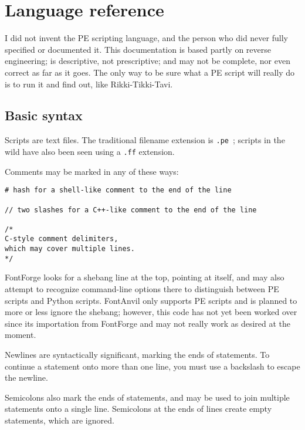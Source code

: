 \chapter{Language reference}

\begin{framed}
I did not invent the PE scripting language, and the person who did never
fully specified or documented it.  This documentation is based partly on
reverse engineering; is descriptive, not prescriptive; and may not be
complete, nor even correct as far as it goes.  The only way to be sure
what a PE script will really do is to run it and find out, like
Rikki-Tikki-Tavi.
\end{framed}

\section{Basic syntax}

Scripts are text files.  The traditional filename extension is \texttt{.pe}~;
scripts in the wild have also been seen using a \texttt{.ff} extension.

Comments may be marked in any of these ways:
\begin{verbatim}
# hash for a shell-like comment to the end of the line

// two slashes for a C++-like comment to the end of the line

/*
C-style comment delimiters,
which may cover multiple lines.
*/
\end{verbatim}

FontForge looks for a shebang line at the top, pointing at itself, and may
also attempt to recognize command-line options there to distinguish between
PE scripts and Python scripts.  FontAnvil only supports PE scripts and is
planned to more or less ignore the shebang; however, this code has not yet
been worked over since its importation from FontForge and may not really
work as desired at the moment.

\begin{framed}
Newlines are syntactically significant, marking the ends of
statements.
To continue a statement onto more than one line, you must use a backslash to
escape the newline.  
\end{framed}

Semicolons also mark the ends of statements, and may be used to join
multiple statements onto a single line.  Semicolons at the ends of lines
create empty statements, which are ignored.

